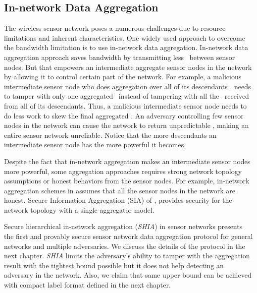		\subsection{In-network Data Aggregation}
	The wireless sensor network poses a numerous challenges due to resource limitations and inherent characteristics. 
	One widely used approach to overcome the bandwidth limitation is to use in-network data aggregation.
	In-network data aggregation approach saves bandwidth by transmitting less \payloads\  between sensor nodes.
	But that empowers an intermediate aggregate sensor nodes in the network by allowing it to control certain part of the network.
	For example, a malicious intermediate sensor node who does aggregation over all of its descendants \payloads, needs to tamper with only one aggregated \payload\ instead of tampering with all the \payloads\ received from all of its descendants. 
	Thus, a malicious intermediate sensor node needs to do less work to skew the final aggregated \payload.
	An adversary controlling few sensor nodes in the network can cause the network to return unpredictable \payloads, making an entire sensor network unreliable.
	Notice that the more descendants an intermediate sensor node has the more powerful it becomes.
	
	Despite the fact that in-network aggregation makes an intermediate sensor nodes more powerful, some aggregation approaches requires strong network topology assumptions or honest behaviors from the sensor nodes.
	For example, in-network aggregation schemes in \cite{yao2002cougar, madden2003design} assumes that all the sensor nodes in the network are honest. Secure Information Aggregation (SIA) of \cite{przydatek2003sia}, provides security for the network topology with a single-aggregator model.  

	Secure hierarchical in-network aggregation (\textit{SHIA}) in sensor networks \cite{chan2006secure} presents the first and provably secure sensor network data aggregation protocol for general networks and multiple adversaries. 
	We discuss the details of the protocol in the next chapter. 
	\textit{SHIA} limits the adversary's ability to tamper with the aggregation result with the tightest bound possible but it does not help detecting an adversary in the network.
	Also, we claim that same upper bound can be achieved with compact label format defined in the next chapter.
